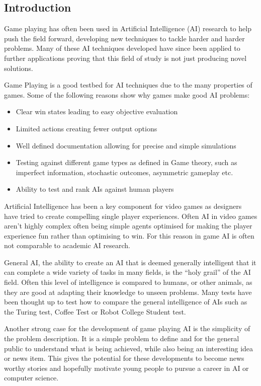 \documentclass[a4paper]{article}
\begin{document}
\subsection{Introduction}
Game playing has often been used in Artificial Intelligence (AI) research to help push the field forward, developing new techniques to tackle harder and harder problems.
Many of these AI techniques developed have since been applied to further applications proving that this field of study is not just producing novel solutions.
\par
Game Playing is a good testbed for AI techniques due to the many properties of games.
Some of the following reasons show why games make good AI problems:
\begin{itemize}[noitemsep,nolistsep]
    \item Clear win states leading to easy objective evaluation
    \item Limited actions creating fewer output options
    \item Well defined documentation allowing for precise and simple simulations
    \item Testing against different game types as defined in Game theory, such as imperfect information, stochastic outcomes, asymmetric gameplay etc.
    \item Ability to test and rank AIs against human players
\end{itemize}
\par
Artificial Intelligence has been a key component for video games as designers have tried to create compelling single player experiences.
Often AI in video games aren't highly complex often being simple agents optimised for making the player experience fun rather than optimising to win.
For this reason in game AI is often not comparable to academic AI research.
\par
General AI, the ability to create an AI that is deemed generally intelligent that it can complete a wide variety of tasks in many fields, is the ``holy grail'' of the AI field.
Often this level of intelligence is compared to humans, or other animals, as they are good at adapting their knowledge to unseen problems.
Many tests have been thought up to test how to compare the general intelligence of AIs such as the Turing test, Coffee Test or Robot College Student test\cite{AGITests}.
\par
Another strong case for the development of game playing AI is the simplicity of the problem description.
It is a simple problem to define and for the general public to understand what is being achieved, while also being an interesting idea or news item.
This gives the potential for these developments to become news worthy stories and hopefully motivate young people to pursue a career in AI or computer science.
\end{document}
